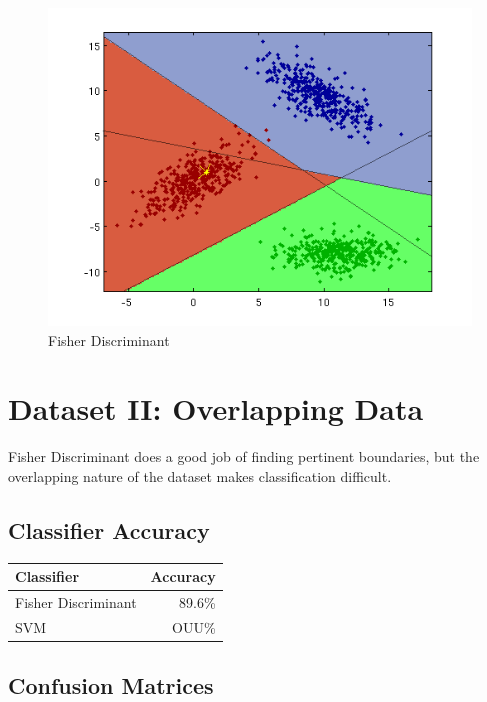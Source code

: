 \documentclass[a4paper]{article}
\begin{document}
\begin{figure}[htbp!]
\center
\includegraphics[clip, trim=40px 15px 30px 10px]{ls_fisher.png}
\caption{Fisher Discriminant}
\end{figure}



\newpage
\section{Dataset II: Overlapping Data}
Fisher Discriminant does a good job of finding pertinent boundaries, but the overlapping nature of the dataset makes classification difficult.
\subsection{Classifier Accuracy}

\begin{tabular}{ | l | r | }
\hline
\textbf{Classifier} & \textbf{Accuracy} \\
\hline
Fisher Discriminant  &   89.6\% \\
\hline
SVM          &   OUU\% \\
\hline

\end{tabular}

\subsection{Confusion Matrices}
\end{document}
